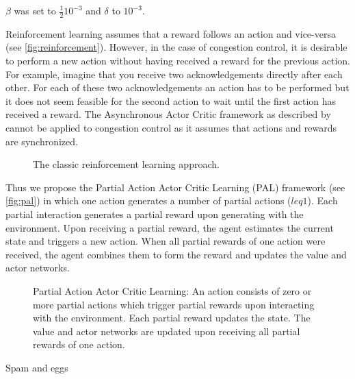 \documentclass[sigconf]{acmart}
\begin{document}
$\beta$ was set to $\frac 1 2 10^{-3}$ and $\delta$ to $10^{-3}$.

Reinforcement learning assumes that a reward follows an action and vice-versa (see \autoref{fig:reinforcement}). However, in the case of congestion control, it is desirable to perform a new action without having received a reward for the previous action. For example, imagine that you receive two acknowledgements directly after each other. For each of these two acknowledgements an action has to be performed but it does not seem feasible for the second action to wait until the first action has received a reward. The Asynchronous Actor Critic framework as described by \cite{mnih_asynchronous_2016} cannot be applied to congestion control as it assumes that actions and rewards are synchronized.

\begin{figure}

\caption{The classic reinforcement learning approach.\protect\footnotemark}
\label{fig:reinforcement}
\end{figure}

Thus we propose the Partial Action Actor Critic Learning (PAL) framework (see \autoref{fig:pal}) in which one action generates a number of partial actions ($leq 1$). Each partial interaction generates a partial reward upon generating with the environment. Upon receiving a partial reward, the agent estimates the current state and triggers a new action. When all partial rewards of one action were received, the agent combines them to form the reward and updates the value and actor networks. 

\begin{figure}

\caption{Partial Action Actor Critic Learning: An action consists of zero or more partial actions which trigger partial rewards upon interacting with the environment. Each partial reward updates the state. The value and actor networks are updated upon receiving all partial rewards of one action.\protect\footnotemark}
\label{fig:pal}
\end{figure}

Spam and eggs
 


\end{document}
